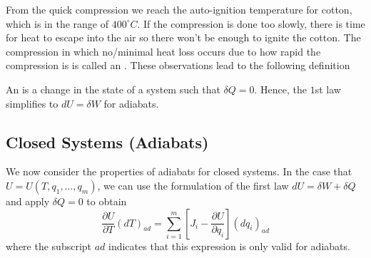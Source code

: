 \documentclass[12pt, a4paper, oneside, openright, titlepage]{book}
\begin{document}
From the quick compression we reach the auto-ignition temperature for cotton, which is in the range of $400^{\circ}C$. If the compression is done too slowly, there is time for heat to escape into the air so there won't be enough to ignite the cotton. The compression in which no/minimal heat loss occurs due to how rapid the compression is is called an . These observations lead to the following definition 

\begin{defn}
    An  is a change in the state of a system such that $\delta Q = 0$. Hence, the $1$st law simplifies to $dU = \delta W$ for adiabats.
\end{defn}

\subsection{Closed Systems (Adiabats)}


We now consider the properties of adiabats for closed systems. In the case that $U = U(T,q_1,...,q_m)$, we can use the formulation of the first law $dU = \delta W + \delta Q$ and apply $\delta Q = 0$ to obtain \begin{equation*}
    \frac{\partial U}{\partial T}(dT)_{ad} = \sum_{i=1}^m\left[J_i - \frac{\partial U}{\partial q_i}\right](dq_i)_{ad}
\end{equation*}
where the subscript $ad$ indicates that this expression is only valid for adiabats. 
\end{document}
